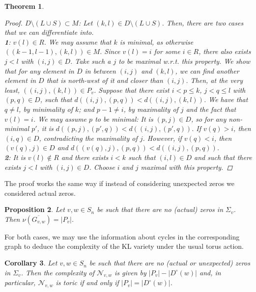 \documentclass[11pt]{amsart}
\newtheorem{theorem}{Theorem}[section]
\newtheorem{proposition}[theorem]{Proposition}
\newtheorem{corollary}[theorem]{Corollary}
\theoremstyle{definition}
\theoremstyle{definition}
\theoremstyle{definition}
\theoremstyle{definition}
\newcommand{\Nvw}{\mathcal{N}_{v,w}}
\newcommand{\cn}{\nu}
\newcommand{\Gvwtt}{\overline{G_{v,w}}}
\begin{document}
\begin{theorem}
\begin{proof}
\noindent
\underline{$D \setminus (L \cup S) \subset M$}: Let $(k,l) \in D \setminus (L \cup S)$. Then, there are two cases that we can differentiate into. \\
\textbf{1}: $v(l) \in R$. We may assume that $k$ is minimal, as otherwise $((k-1,l-1),(k,l))\in M$. Since $v(l)=i$ for some $i \in R$, there also exists $j <l$ with $(i,j)\in D$. Take such a $j$ to be maximal w.r.t. this property. 
We show that for any element in $D$ in between $(i,j)$ and $(k,l)$, we can find another element in $D$ that is north-west of it and closer than $(i,j)$. Then, at the very least, $((i,j),(k,l))\in P_v$.
Suppose that there exist $i<p\leq k$, $j <q \leq l$ with $(p,q)\in D$, such that $d((i,j),(p,q)) < d((i,j),(k,l))$. We have that $q \neq l$, by minimality of $k$; and $p-1 \neq i$, by maximality of $j$ and the fact that $v(l) = i$. We may assume $p$ to be minimal: It is $(p,j)\in D$, so for any non-minimal $p'$, it is $d((p,j),(p',q))<d((i,j),(p',q))$. If $v(q)>i$, then $(i,q)\in D$, contradicting the maximality of $j$. However, if $v(q) <i$, then $(v(q),j)\in D$ and $d((v(q),j),(p,q)) < d((i,j),(p,q))$. \\
\textbf{2}: It is $v(l) \not\in R$ and there exists $i<k$ such that $(i,l)\in D$ and such that there exists $j <l$ with $(i,j)\in D$. Choose $i$ and $j$ maximal with this property. 
\end{proof}
\end{theorem}

\noindent The proof works the same way if instead of considering  unexpected zeros we considered actual zeros. 

\begin{proposition} 
Let $v,w \in S_n$ be such that there are no (actual) zeros in  $\Sigma_v$. Then $ \cn(\Gvwtt) = |P_v|$.
\end{proposition}

\noindent For both cases, we may use the information about cycles in the corresponding graph to deduce the complexity of the KL variety under the usual torus action.

\begin{corollary}\label{cor: toric unexp zeros}
   Let $v,w \in S_n$ be such that there are no (actual or unexpected) zeros in  $\Sigma_v$. Then 
   the complexity of $\Nvw$ is given by $|P_v| - |D^{\circ}(w)|$ and, in particular,
   $\Nvw$ is toric if and only if $|P_v| = |D^{\circ}(w)|$. 
\end{corollary}
\end{document}
